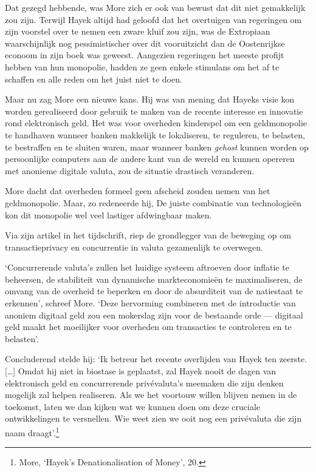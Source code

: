 \documentclass[
  a5paper,
  smalldemyvopaper,11pt,twoside,onecolumn,openright,extrafontsizes]{memoir}
\begin{document}
Dat gezegd hebbende, was More zich er ook van bewust dat dit niet
gemakkelijk zou zijn. Terwijl Hayek altijd had geloofd dat het
overtuigen van regeringen om zijn voorstel over te nemen een zware kluif
zou zijn, was de Extropiaan waarschijnlijk nog pessimistischer over dit
vooruitzicht dan de Oostenrijkse econoom in zijn boek was geweest.
Aangezien regeringen het meeste profijt hebben van hun monopolie, hadden
ze geen enkele stimulans om het af te schaffen en alle reden om het
juist niet te doen.

Maar nu zag More een nieuwe kans. Hij was van mening dat Hayeks visie
kon worden gerealiseerd door gebruik te maken van de recente interesse
en innovatie rond elektronisch geld. Het was voor overheden kinderspel
om een geldmonopolie te handhaven wanneer banken makkelijk te
lokaliseren, te reguleren, te belasten, te bestraffen en te sluiten
waren, maar wanneer banken \emph{gehost} kunnen worden op persoonlijke
computers aan de andere kant van de wereld en kunnen opereren met
anonieme digitale valuta, zou de situatie drastisch veranderen.

More dacht dat overheden formeel geen afscheid zouden nemen van het
geldmonopolie. Maar, zo redeneerde hij, De juiste combinatie van
technologieën kon dit monopolie wel veel lastiger afdwingbaar maken.

Via zijn artikel in het tijdschrift, riep de grondlegger van de beweging
op om transactieprivacy en concurrentie in valuta gezamenlijk te
overwegen.

`Concurrerende valuta's zullen het huidige systeem aftroeven door
inflatie te beheersen, de stabiliteit van dynamische markteconomieën te
maximaliseren, de omvang van de overheid te beperken en door de
absurditeit van de natiestaat te erkennen', schreef More. `Deze
hervorming combineren met de introductie van anoniem digitaal geld zou
een mokerslag zijn voor de bestaande orde --- digitaal geld maakt het
moeilijker voor overheden om transacties te controleren en te belasten'.

Concluderend stelde hij: `Ik betreur het recente overlijden van Hayek
ten zeerste. {[}\ldots{]} Omdat hij niet in biostase is geplaatst, zal
Hayek nooit de dagen van elektronisch geld en concurrerende
privévaluta's meemaken die zijn denken mogelijk zal helpen realiseren.
Als we het voortouw willen blijven nemen in de toekomst, laten we dan
kijken wat we kunnen doen om deze cruciale ontwikkelingen te versnellen.
Wie weet zien we ooit nog een privévaluta die zijn naam
draagt'.\footnote{More, `Hayek's Denationalisation of Money', 20.}
\end{document}
